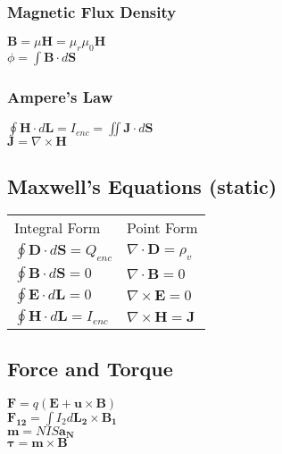 \documentclass[12pt]{exam}
\begin{document}
\begin{multicols}{2}
\begin{flushleft}
	\subsubsection*{Magnetic Flux Density}
				\vspace{0.1in}
	{ \addtolength{\leftskip}{0.5in}
		$\mathbf{B} = \mu\mathbf{H} = \mu_r\mu_0\mathbf{H}$ \\[4pt]
		$\phi = \int\mathbf{B}\cdot d\mathbf{S} $ \\ [4 pt]
	}
			\vspace{0.1in}
	
	\subsubsection*{Ampere's Law}
				\vspace{0.1in}
	{ \addtolength{\leftskip}{0.5in}
		$\oint\mathbf{H}\cdot d\mathbf{L} = I_{enc} = \iint \mathbf{J} \cdot d\mathbf{S}$ \\[4pt]
		$\mathbf{J} = \nabla \times \mathbf{H}$ \\ [4 pt]
	}

	\subsection*{Maxwell's Equations (static)}
	\vspace{0.1in}
	{\addtolength{\leftskip}{0.5in}
		\begin{tabular}{l l}
			Integral Form & Point Form \\ [4 pt]
			$\oint\mathbf{D}\cdot d\mathbf{S} = Q_{enc}$ & $\nabla\cdot\mathbf{D} = \rho_v$  \\[4 pt]
			$\oint\mathbf{B}\cdot d\mathbf{S} = 0$ &  $\nabla\cdot\mathbf{B} = 0$ \\[4 pt]
			$\oint\mathbf{E}\cdot d\mathbf{L} = 0$ &  $\nabla\times\mathbf{E} = 0$ \\[4 pt]
			$\oint\mathbf{H}\cdot d\mathbf{L} = I_{enc}$ &  $\nabla\times\mathbf{H} = \mathbf{J}$ \\[4 pt]
		\end{tabular}
	}

\columnbreak

	\subsection*{Force and Torque}
	\vspace{0.1in}
	{\addtolength{\leftskip}{0.5in}
		$ \mathbf{F} = q(\mathbf{E}+\mathbf{u}\times\mathbf{B}) $ \\ [4 pt]
		$ \mathbf{F_{12}} = \int I_2d\mathbf{L_2}\times\mathbf{B_1} $ \\[4 pt]
		$ \mathbf{m} = NIS\mathbf{a_N} $ \\[4 pt]
		$ \mathbf{\tau} = \mathbf{m}\times\mathbf{B} $ \\[4 pt]
	}


\end{flushleft}
\end{multicols}
\end{document}
